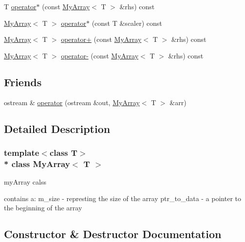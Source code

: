 \begin{DoxyCompactItemize}
\item 
T \hyperlink{classMyArray_a491463a1b65467564e572c005bdc38df}{operator$\ast$} (const \hyperlink{classMyArray}{My\+Array}$<$ T $>$ \&rhs) const 
\item 
\hyperlink{classMyArray}{My\+Array}$<$ T $>$ \hyperlink{classMyArray_a65f0252bd35555144a102fe5c4e30629}{operator$\ast$} (const T \&scaler) const 
\item 
\hyperlink{classMyArray}{My\+Array}$<$ T $>$ \hyperlink{classMyArray_ae409f4dbb669a3993c7ea2099ca9076a}{operator+} (const \hyperlink{classMyArray}{My\+Array}$<$ T $>$ \&rhs) const 
\item 
\hyperlink{classMyArray}{My\+Array}$<$ T $>$ \hyperlink{classMyArray_a681601413d5b03d3319959186537430c}{operator-\/} (const \hyperlink{classMyArray}{My\+Array}$<$ T $>$ \&rhs) const 
\end{DoxyCompactItemize}
\subsection*{Friends}
\begin{DoxyCompactItemize}
\item 
ostream \& \hyperlink{classMyArray_affe58e61c0c2cd8a54240bb543d827aa}{operator} (ostream \&out, \hyperlink{classMyArray}{My\+Array}$<$ T $>$ \&arr)
\end{DoxyCompactItemize}


\subsection{Detailed Description}
\subsubsection*{template$<$class T$>$\\*
class My\+Array$<$ T $>$}

my\+Array calss

contains a\+: m\+\_\+size -\/ represting the size of the array ptr\+\_\+to\+\_\+data -\/ a pointer to the beginning of the array 

\subsection{Constructor \& Destructor Documentation}
